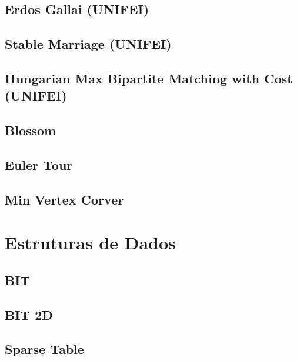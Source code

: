 \subsection{Erdos Gallai (UNIFEI)}
\raggedbottom
\hrulefill
\subsection{Stable Marriage (UNIFEI)}
\raggedbottom
\hrulefill
\subsection{Hungarian Max Bipartite Matching with Cost (UNIFEI)}
\raggedbottom
\hrulefill
\subsection{Blossom}
\raggedbottom
\hrulefill
\subsection{Euler Tour}
\raggedbottom
\hrulefill
\subsection{Min Vertex Corver}
\raggedbottom
\hrulefill

\section{Estruturas de Dados}
\subsection{BIT}
\raggedbottom
\hrulefill
\subsection{BIT 2D}
\raggedbottom
\hrulefill
\subsection{Sparse Table}
\raggedbottom
\hrulefill
